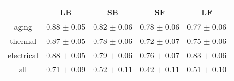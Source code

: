 \begin{tabular}{c c c c c }
\hline
 & LB & SB & SF & LF \\
\hline
aging & 0.88 $\pm$ 0.05 & 0.82 $\pm$ 0.06 & 0.78 $\pm$ 0.06 & 0.77 $\pm$ 0.06 \\
thermal & 0.87 $\pm$ 0.05 & 0.78 $\pm$ 0.06 & 0.72 $\pm$ 0.07 & 0.75 $\pm$ 0.06 \\
electrical & 0.88 $\pm$ 0.05 & 0.79 $\pm$ 0.06 & 0.76 $\pm$ 0.07 & 0.83 $\pm$ 0.06 \\
all & 0.71 $\pm$ 0.09 & 0.52 $\pm$ 0.11 & 0.42 $\pm$ 0.11 & 0.51 $\pm$ 0.10 \\
\hline
\end{tabular}